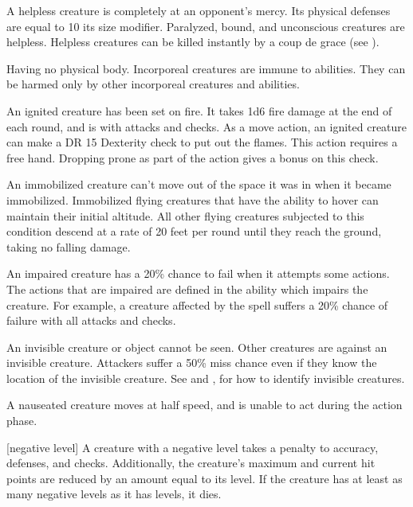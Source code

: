  A helpless creature is completely at an opponent's mercy. Its physical defenses are equal to 10 \add its size modifier. Paralyzed, bound, and unconscious creatures are helpless. Helpless creatures can be killed instantly by a coup de grace (see ).

 Having no physical body. Incorporeal creatures are immune to  abilities. They can be harmed only by other incorporeal creatures and  abilities.

 An ignited creature has been set on fire. It takes 1d6 fire damage at the end of each round, and is \impaired with attacks and checks. As a move action, an ignited creature can make a DR 15 Dexterity check to put out the flames. This action requires a free hand. Dropping prone as part of the action gives a  bonus on this check.

 An immobilized creature can't move out of the space it was in when it became immobilized. Immobilized flying creatures that have the ability to hover can maintain their initial altitude. All other flying creatures subjected to this condition descend at a rate of 20 feet per round until they reach the ground, taking no falling damage.

 An impaired creature has a 20\% chance to fail when it attempts some actions. The actions that are impaired are defined in the ability which impairs the creature. For example, a creature affected by the  spell suffers a 20\% chance of failure with all attacks and checks.

 An invisible creature or object cannot be seen. Other creatures are  against an invisible creature. Attackers suffer a 50\% miss chance even if they know the location of the invisible creature. See  and , for how to identify invisible creatures.


 A nauseated creature moves at half speed, and is unable to act during the action phase.

[negative level] A creature with a negative level takes a  penalty to accuracy, defenses, and checks. Additionally, the creature's maximum and current hit points are reduced by an amount equal to its level. If the creature has at least as many negative levels as it has levels, it dies.

